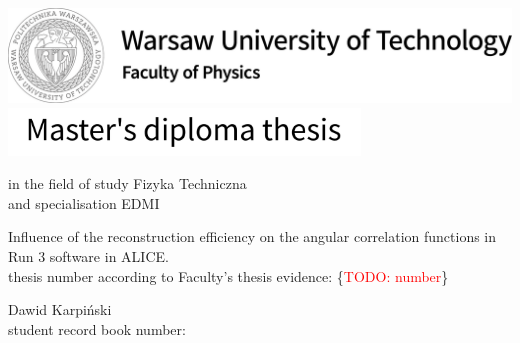 \documentclass[11pt,a4paper,twoside]{book}
\numberwithin{equation}{chapter}
\newcommand{\todo}[1]{\textcolor{red}{TODO: #1}}
\newcommand{\thesistitle}{Influence of the reconstruction efficiency on the angular correlation functions in Run 3 software in ALICE.}
\begin{document}
\pagestyle{empty}

\begin{titlepage}
	\begin{minipage}{\textwidth}
		\begin{center}
			\includegraphics[scale=0.2]{img/WF_ENG} \\
			\vspace{1.5cm}
			\includegraphics[width=0.7\textwidth]{img/mgr_en}
		\end{center}
	\end{minipage}
	
	\vspace{1.5cm}
	
	\begin{minipage}{\textwidth}
		\begin{center}
			{\large in the field of study Fizyka Techniczna \\
				and specialisation EDMI}
		\end{center}
	\end{minipage}
	
	\vspace{1.5cm}
	
	\begin{minipage}{\textwidth}
		\begin{center}
			{\LARGE \thesistitle}
			\vspace{0.5cm}\\
			{\large thesis number according to Faculty's thesis evidence: \{\todo{number}\}}
		\end{center}
	\end{minipage}
	
	\vspace{1.5cm}
	
	\begin{minipage}{\textwidth}
		\begin{center}
			{\LARGE Dawid Karpiński}
			\vspace{0.5cm}\\
			{\large student record book number: \INDEX}
		\end{center}
	\end{minipage}
	

\end{titlepage}
\end{document}
